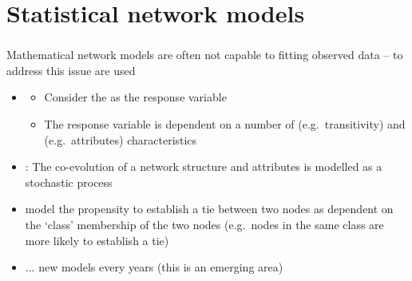 \documentclass[8pt]{beamer}
\begin{document}


\section{Statistical network models}

\bgroup
{}
\begin{frame}[plain]{}
\begin{center}
\color{white}{\Huge\insertsection}
\end{center}
\end{frame}
\egroup


\begin{frame}
\frametitle{\insertsection}

Mathematical network models are often not capable to fitting observed data -- to address this issue {\color{blue}{statistical network models}} are used

\medskip

\begin{itemize}
\item {\color{blue}{Exponential Random Graph Models (ERGM)}} 
	\begin{itemize}
	\item Consider the {\color{blue}{presence/absence of a tie}} as the response variable
	\item The response variable is dependent on a number of {\color{blue}{endogenous}} (e.g.\ transitivity) and {\color{blue}{exogenous}} (e.g.\ attributes) characteristics \cite{Robins2007}
	\end{itemize}

\medskip
\medskip

\item{\color{blue}{Stochastic Actor-Oriented Models (SAOM)}}: The co-evolution of a network structure and attributes is modelled as a stochastic process \cite{Snijders2010}

\medskip
\medskip
  
\item {\color{blue}{Network Block Models}} model the propensity to establish a tie between two nodes as dependent on the `class' membership of the two nodes (e.g.\ nodes in the same class are more likely to establish a tie) \cite{Doreian1984}

\medskip
\medskip
\item ... new models every years (this is an emerging area) 
\end{itemize}


\end{frame}
\end{document}
